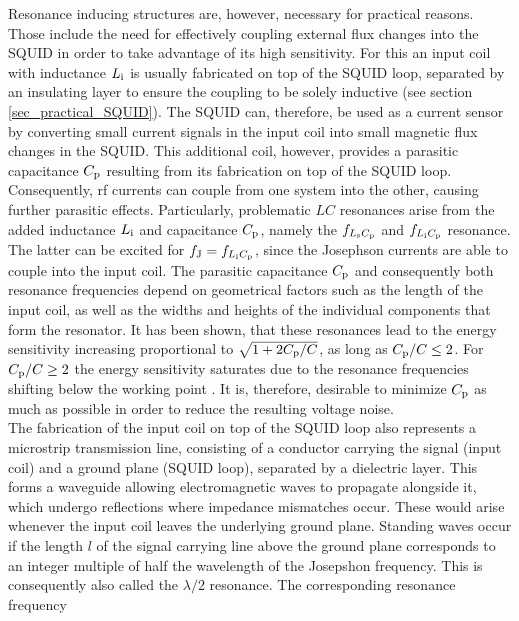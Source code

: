 Resonance inducing structures are, however, necessary for practical reasons. Those include the need for effectively coupling  external flux changes into the SQUID in order to take advantage of its high sensitivity. For this an input coil with inductance $L_{\rm i}$ is usually fabricated on top of the SQUID loop, separated by an insulating layer to ensure the coupling to be solely inductive (see section \ref{sec_practical_SQUID}). The SQUID can, therefore, be used as a current sensor by converting small current signals in the input coil into small magnetic flux changes in the SQUID. This additional coil, however, provides a parasitic capacitance $C_{\rm p}$ resulting from its fabrication on top of the SQUID loop. Consequently, rf currents can couple from one system into the other, causing further parasitic effects. Particularly, problematic $LC$ resonances arise from the added inductance $L_{\rm i}$ and capacitance $C_{\rm p}$, namely the $f_{L_{\rm s}C_{\rm p}}$ and $f_{L_{\rm i}C_{\rm p}}$ resonance. The latter can be excited for $f_{\rm J}=f_{L_{\rm i}C_{\rm p}}$, since the Josephson currents are able to couple into the input coil. The parasitic capacitance $C_{\rm p}$ and consequently both resonance frequencies depend on geometrical factors such as the length of the input coil, as well as the widths and heights of the individual components that form the resonator. It has been shown, that these resonances lead to the energy sensitivity increasing proportional to $\sqrt{1+2C_{\rm p}/C}$, as long as $C_{\rm p}/C\leq 2$. For $C_{\rm p}/C\geq 2$ the energy sensitivity saturates due to the resonance frequencies shifting below the working point \cite{Ryh1992}. It is, therefore, desirable to minimize $C_{\rm p}$ as much as possible in order to reduce the resulting voltage noise. \\

The fabrication of the input coil on top of the SQUID loop also represents a microstrip transmission line, consisting of a conductor carrying the signal (input coil) and a ground plane (SQUID loop), separated by a dielectric layer. This forms a waveguide allowing electromagnetic waves to propagate alongside it, which undergo reflections where impedance mismatches occur. These would arise whenever the input coil leaves the underlying ground plane. Standing waves occur if the length $l$ of the signal carrying line above the ground plane corresponds to an integer multiple of half the wavelength of the Josepshon frequency. This is consequently also called the $\lambda/2$ resonance. The corresponding resonance frequency 

